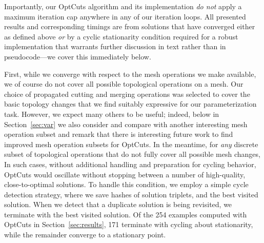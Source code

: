 
Importantly, our OptCuts algorithm and its implementation \emph{do not} apply a maximum iteration cap anywhere in any of our iteration loops. All presented results and corresponding timings are from solutions that have converged either as defined above \emph{or} by a cyclic stationarity condition required for a robust implementation that warrants further discussion in text rather than in pseudocode---we cover this immediately below.

First, while we converge with respect to the mesh operations we make available, we of course do not cover all possible topological operations on a mesh. Our choice of propagated cutting and merging operations was selected to cover the basic topology changes that we find suitably expressive for our parameterization task. However, we expect many others to be useful; indeed, below in Section~\ref{sec:var} we also consider and compare with another interesting mesh operation subset and remark that there is interesting future work to find improved mesh operation subsets for OptCuts. In the meantime, for \emph{any} discrete subset of topological operations that do not fully cover all possible mesh changes,  In such cases, without additional handling and preparation for cycling behavior, OptCuts would oscillate without stopping between a number of high-quality, close-to-optimal solutions. To handle this condition, we employ a simple cycle detection strategy, where  we save hashes  of  solution triplets, and the best visited solution. When we detect that a duplicate solution is being revisited, we terminate with the best visited solution. Of the 254 examples computed with OptCuts in Section~\ref{sec:results}, 171 terminate with cycling about stationarity, while the remainder converge to a stationary point. 

